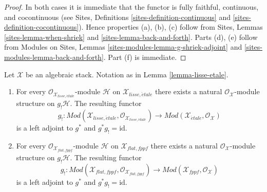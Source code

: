 \begin{proof}
In both cases it is immediate that the functor is fully faithful,
continuous, and cocontinuous (see
Sites, Definitions \ref{sites-definition-continuous} and
\ref{sites-definition-cocontinuous}).
Hence properties (a), (b), (c) follow from
Sites, Lemmas \ref{sites-lemma-when-shriek} and
\ref{sites-lemma-back-and-forth}.
Parts (d), (e) follow from
Modules on Sites, Lemmas \ref{sites-modules-lemma-g-shriek-adjoint} and
\ref{sites-modules-lemma-back-and-forth}.
Part (f) is immediate.
\end{proof}

\begin{lemma}
\label{lemma-lisse-etale-modules}
Let $\mathcal{X}$ be an algebraic stack. Notation as in
Lemma \ref{lemma-lisse-etale}.
\begin{enumerate}
\item For every $\mathcal{O}_{\mathcal{X}_{lisse,\acute{e}tale}}$-module
$\mathcal{H}$ on $\mathcal{X}_{lisse,\acute{e}tale}$ there exists a
natural $\mathcal{O}_\mathcal{X}$-module structure on $g_!\mathcal{H}$.
The resulting functor
$$
g_! :
\textit{Mod}(\mathcal{X}_{lisse,\acute{e}tale},
\mathcal{O}_{\mathcal{X}_{lisse,\acute{e}tale}})
\longrightarrow
\textit{Mod}(\mathcal{X}_{\acute{e}tale}, \mathcal{O}_{\mathcal{X}})
$$
is a left adjoint to $g^*$ and $g^*g_! = \text{id}$.
\item For every $\mathcal{O}_{\mathcal{X}_{flat,fppf}}$-module
$\mathcal{H}$ on $\mathcal{X}_{flat,fppf}$ there exists a
natural $\mathcal{O}_\mathcal{X}$-module structure on $g_!\mathcal{H}$.
The resulting functor
$$
g_! :
\textit{Mod}(\mathcal{X}_{flat,fppf},
\mathcal{O}_{\mathcal{X}_{flat,fppf}})
\longrightarrow
\textit{Mod}(\mathcal{X}_{fppf}, \mathcal{O}_{\mathcal{X}})
$$
is a left adjoint to $g^*$ and $g^*g_! = \text{id}$.
\end{enumerate}
\end{lemma}

